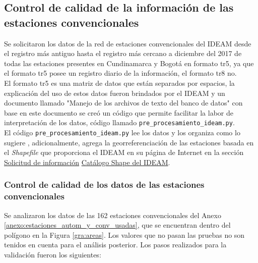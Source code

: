 \subsection{Control de calidad de la información de las estaciones convencionales}

Se solicitaron los datos de la red de estaciones convencionales del IDEAM desde el registro más antiguo hasta el registro más cercano a diciembre del 2017 de todas las estaciones presentes en Cundinamarca y Bogotá en formato tr5, ya que el formato tr5 posee un registro diario de la información, el formato tr8 no.\\

El formato tr5 es una matriz de datos que están separados por espacios, la explicación del uso de estos datos fueron brindados por el IDEAM y un documento llamado "Manejo de los archivos de texto del banco de datos" \citep{pedraza2015} con base en este documento se creó un código que permite facilitar la labor de interpretación de los datos, código llamado \texttt{pre\_procesamiento\_ideam.py}.\\

El código \texttt{pre\_procesamiento\_ideam.py} lee los datos y los organiza como lo sugiere \citet{pedraza2015}, adicionalmente, agrega la georreferenciación de las estaciones basada en el \textit{Shapefile} que proporciona el IDEAM en su página de Internet en la sección  \textcolor{blue}{ \href{http://www.ideam.gov.co/solicitud-de-informacion}{Solicitud de información}} \textcolor{blue}{ \href{institucional.ideam.gov.co/jsp/info/institucional/publicaciones/CATALOGO_ESTACIONES_IDEAM_V10_AGOSTO2017.zip}{Catálogo Shape del IDEAM}}.\\


\subsubsection{Control de calidad de los datos de las estaciones convencionales}

Se analizaron los datos de las 162 estaciones convencionales del Anexo \ref{anexo:estaciones_autom_y_conv_usadas},  que se encuentran dentro del polígono en la Figura \ref{gra:areas}. Los valores que no pasan las pruebas no son tenidos en cuenta para el análisis posterior. Los pasos realizados para la validación fueron los siguientes:\\


